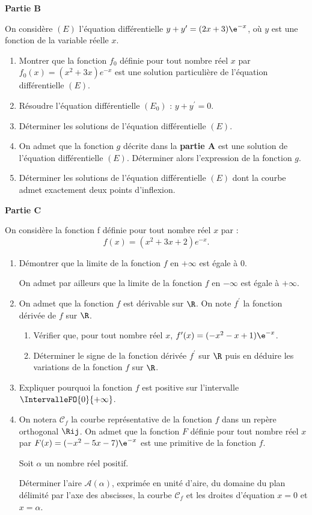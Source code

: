 \begin{center}
	\textbf{Partie B}
\end{center}

On considère $(E)$ l'équation différentielle $y + y^{\prime} = (2x + 3)\e^{-x}$, où $y$ est une fonction de la variable réelle $x$.

\begin{enumerate}
	\item Montrer que la fonction $f_{0}$ définie pour tout nombre réel $x$ par $f_{0}(x) = (x^{2} + 3x)e^{-x}$ est une solution particulière de l'équation différentielle $(E)$.
	\item Résoudre l'équation différentielle $(E_{0})$ : $y + y^{\prime} = 0$.
	\item Déterminer les solutions de l'équation différentielle $(E)$.
	\item On admet que la fonction $g$ décrite dans la \textbf{partie A} est une solution de l'équation différentielle $(E)$. Déterminer alors l'expression de la fonction $g$.
	\item Déterminer les solutions de l'équation différentielle $(E)$ dont la courbe admet exactement deux points d'inflexion.
\end{enumerate}

\begin{center}
	\textbf{Partie C}
\end{center}

On considère la fonction f définie pour tout nombre réel $x$ par : \[ f(x) = (x^{2} + 3x + 2)e^{-x}. \]
%
\begin{enumerate}
	\item Démontrer que la limite de la fonction $f$ en $+\infty$ est égale à 0.
	
	On admet par ailleurs que la limite de la fonction $f$ en $-\infty$ est égale à $+\infty$.
	\item On admet que la fonction $f$ est dérivable sur $\R$. On note $f^{\prime}$ la fonction dérivée de $f$ sur $\R$.
	\begin{enumerate}
		\item Vérifier que, pour tout nombre réel $x$, $f^{\prime}(x) = (-x^{2} - x + 1)\e^{-x}$.
		\item Déterminer le signe de la fonction dérivée $f^{\prime}$ sur $\R$ puis en déduire les variations de la fonction $f$ sur $\R$.
	\end{enumerate}
	\item Expliquer pourquoi la fonction $f$ est positive sur l'intervalle $\IntervalleFO{0}{+\infty}$.
	\item On notera $\mathcal{C}_{f}$ la courbe représentative de la fonction $f$ dans un repère orthogonal $\Rij$. On admet que la fonction $F$ définie pour tout nombre réel $x$ par $F(x) = (-x^{2} - 5x - 7)\e^{-x}$ est une primitive de la fonction $f$.
	
	Soit $\alpha$ un nombre réel positif.
	
	Déterminer l'aire $\mathcal{A}(\alpha)$, exprimée en unité d'aire, du domaine du plan délimité par l'axe des abscisses, la courbe $\mathcal{C}_{f}$ et les droites d'équation $x = 0$ et $x = \alpha$.
\end{enumerate}